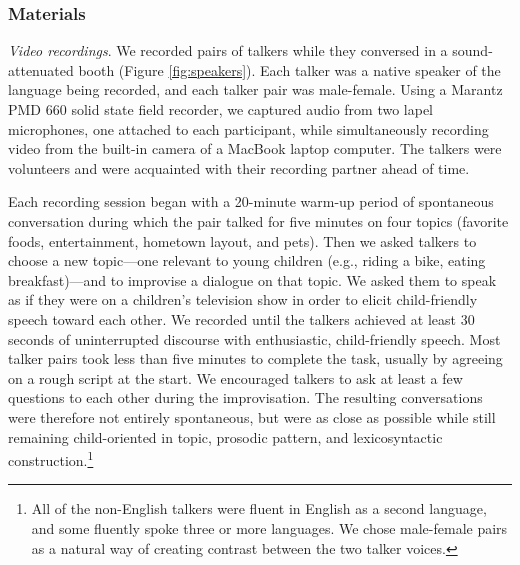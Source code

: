 \documentclass[authoryear, 12pt]{elsarticle}
\begin{document}
\subsubsection*{Materials}

\textit{Video recordings}. We recorded pairs of talkers while they conversed in a sound-attenuated booth (Figure \ref{fig:speakers}). Each talker was a native speaker of the language being recorded, and each talker pair was male-female. Using a Marantz PMD 660 solid state field recorder, we captured audio from two lapel microphones, one attached to each participant, while simultaneously recording video from the built-in camera of a MacBook laptop computer. The talkers were volunteers and were acquainted with their recording partner ahead of time. 

Each recording session began with a 20-minute warm-up period of spontaneous conversation during which the pair talked for five minutes on four topics (favorite foods, entertainment, hometown layout, and pets). Then we asked talkers to choose a new topic---one relevant to young children (e.g., riding a bike, eating breakfast)---and to improvise a dialogue on that topic. We asked them to speak as if they were on a children's television show in order to elicit child-friendly speech toward each other. We recorded until the talkers achieved at least 30 seconds of uninterrupted discourse with enthusiastic, child-friendly speech. Most talker pairs took less than five minutes to complete the task, usually by agreeing on a rough script at the start. We encouraged talkers to ask at least a few questions to each other during the improvisation. The resulting conversations were therefore not entirely spontaneous, but were as close as possible while still remaining child-oriented in topic, prosodic pattern, and lexicosyntactic construction.\footnote{All of the non-English talkers were fluent in English as a second language, and some fluently spoke three or more languages. We chose male-female pairs as a natural way of creating contrast between the two talker voices.}
\end{document}
